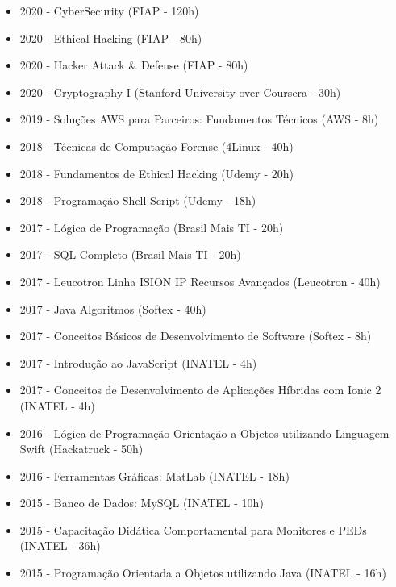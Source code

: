 \documentclass[10pt,a4paper,ragged2e, normalphoto]{altacv}
\begin{document}
\begin{fullwidth}

\begin{itemize}
    \item 2020 - CyberSecurity (FIAP - 120h)
    \item 2020 - Ethical Hacking (FIAP - 80h)
    \item 2020 - Hacker Attack \& Defense (FIAP - 80h)
    \item 2020 - Cryptography I (Stanford University over Coursera - 30h)
    \item 2019 - Soluções AWS para Parceiros: Fundamentos Técnicos (AWS - 8h)
    \item 2018 - Técnicas de Computação Forense (4Linux - 40h)
    \item 2018 - Fundamentos de Ethical Hacking (Udemy - 20h)
    \item 2018 - Programação Shell Script (Udemy - 18h)
    \item 2017 - Lógica de Programação (Brasil Mais TI - 20h)
    \item 2017 - SQL Completo (Brasil Mais TI - 20h)
    \item 2017 - Leucotron Linha ISION IP Recursos Avançados (Leucotron - 40h)
    \item 2017 - Java Algoritmos (Softex - 40h)
    \item 2017 - Conceitos Básicos de Desenvolvimento de Software (Softex - 8h)
    \item 2017 - Introdução ao JavaScript (INATEL - 4h)
    \item 2017 - Conceitos de Desenvolvimento de Aplicações Híbridas com Ionic 2 (INATEL - 4h)
    \item 2016 - Lógica de Programação Orientação a Objetos utilizando Linguagem Swift (Hackatruck - 50h)
    \item 2016 - Ferramentas Gráficas: MatLab (INATEL - 18h)
    \item 2015 - Banco de Dados: MySQL (INATEL - 10h)
    \item 2015 - Capacitação Didática Comportamental para Monitores e PEDs (INATEL - 36h)
    \item 2015 - Programação Orientada a Objetos utilizando Java (INATEL - 16h)
\end{itemize}

\end{fullwidth}
\end{document}
